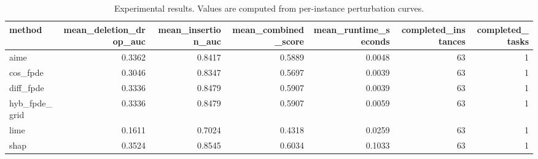 \begin{table}[t]
\caption{Experimental results. Values are computed from per-instance perturbation curves.}
\label{tab:main_results_computed}
\centering
\begin{tabular}{lrrrrrr}
\toprule
method & mean\_deletion\_drop\_auc & mean\_insertion\_auc & mean\_combined\_score & mean\_runtime\_seconds & completed\_instances & completed\_tasks \\
\midrule
aime & 0.3362 & 0.8417 & 0.5889 & 0.0048 & 63 & 1 \\
cos\_fpde & 0.3046 & 0.8347 & 0.5697 & 0.0039 & 63 & 1 \\
diff\_fpde & 0.3336 & 0.8479 & 0.5907 & 0.0039 & 63 & 1 \\
hyb\_fpde\_grid & 0.3336 & 0.8479 & 0.5907 & 0.0059 & 63 & 1 \\
lime & 0.1611 & 0.7024 & 0.4318 & 0.0259 & 63 & 1 \\
shap & 0.3524 & 0.8545 & 0.6034 & 0.1033 & 63 & 1 \\
\bottomrule
\end{tabular}

\end{table}
